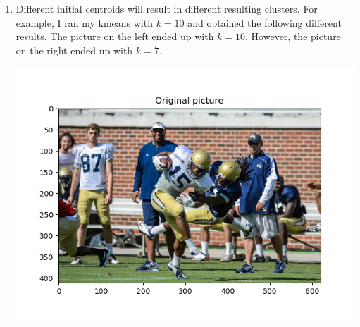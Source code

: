\documentclass[twoside,10pt]{article}
\begin{document}
\begin{enumerate}
    \item Different initial centroids will result in different resulting clusters. For example, I ran my kmeans with $k = 10$ and obtained the following different results. The picture on the left ended up with $k=10$. However, the picture on the right ended up with $k=7$. 
        \begin{center}
        \includegraphics[scale = 0.5]{homework1/football.png}
        \end{center}

\end{enumerate}
\end{document}
